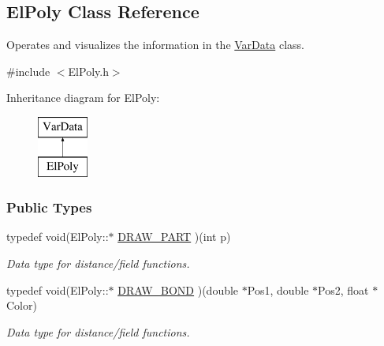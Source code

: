 \hypertarget{classElPoly}{\subsection{\-El\-Poly \-Class \-Reference}
\label{classElPoly}
}


\-Operates and visualizes the information in the \hyperlink{classVarData}{\-Var\-Data} class.  




{\ttfamily \#include $<$\-El\-Poly.\-h$>$}

\-Inheritance diagram for \-El\-Poly\-:\begin{figure}[H]
\begin{center}
\leavevmode
\includegraphics[height=2.000000cm]{classElPoly}
\end{center}
\end{figure}
\subsubsection*{\-Public \-Types}
\begin{DoxyCompactItemize}
\item 
\hypertarget{classElPoly_a2f2db005a652b5d1c28066be4b285fef}{typedef void(\-El\-Poly\-::$\ast$ \hyperlink{classElPoly_a2f2db005a652b5d1c28066be4b285fef}{\-D\-R\-A\-W\-\_\-\-P\-A\-R\-T} )(int p)}\label{classElPoly_a2f2db005a652b5d1c28066be4b285fef}

\begin{DoxyCompactList}\small\item\em \-Data type for distance/field functions. \end{DoxyCompactList}\item 
\hypertarget{classElPoly_af49a42208f561b94e3d8cfef0e61e021}{typedef void(\-El\-Poly\-::$\ast$ \hyperlink{classElPoly_af49a42208f561b94e3d8cfef0e61e021}{\-D\-R\-A\-W\-\_\-\-B\-O\-N\-D} )(double $\ast$\-Pos1, double $\ast$\-Pos2, float $\ast$\-Color)}\label{classElPoly_af49a42208f561b94e3d8cfef0e61e021}

\begin{DoxyCompactList}\small\item\em \-Data type for distance/field functions. \end{DoxyCompactList}\end{DoxyCompactItemize}
